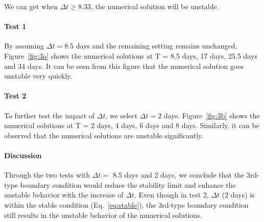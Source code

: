 We can get when $\Delta t \geq 8.33$, the numerical solution will be unstable.

\paragraph{Test 1} By assuming $\Delta t = 8.5$ days and the remaining setting remains unchanged, Figure~\ref{fig:3a} shows the numerical solutions at T = 8.5 days, 17 days, 25.5 days and 34 days. It can be seen from this figure that the numerical solution goes unstable very quickly.

\paragraph{Test 2} To further test the impact of $\Delta t$, we select $\Delta t = 2$ days. Figure~\ref{fig:3b} shows the numerical solutions at T = 2 days, 4 days, 6 days and 8 days. Similarly, it can be observed that the numerical solutions are unstable significantly.

\paragraph{Discussion} Through the two tests with $\Delta t = $ 8.5 days and 2 days, we conclude that the 3rd-type boundary condition would reduce the stability limit and enhance the unstable behavior with the increase of $\Delta t$. Even though in test 2, $\Delta t$ (2 days) is within the stable condition (Eq.~\ref{eq:stable}), the 3rd-type boundary condition still results in the unstable behavior of the numerical solutions.

